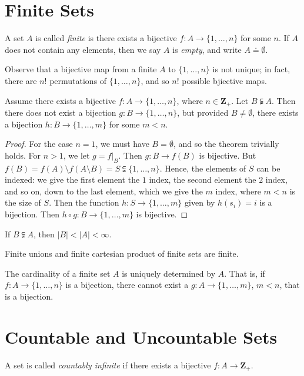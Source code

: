 \section{Finite Sets}
\begin{definition}
A set $A$ is called \emph{finite} is there exists a bijective
$f: A \to \{ 1, \dots, n\}$ for some $n$. If $A$ does not contain any
elements, then we say $A$ is \emph{empty}, and write $A \doteq \emptyset$.
\end{definition}
Observe that a bijective map from a finite $A$ to $\{1, \dots, n\}$ is not
unique; in fact, there are $n$! permutations of $\{1, \dots, n\}$, and so $n$! possible
bjiective maps.
\begin{theorem}\label{thm:subset-bij}
Assume there exists a bijective $f: A \to \{1, \dots, n\}$, where $n \in
\mathbf{Z}_{+}$. Let $B \subsetneqq A$. Then there does not exist a bijection $g: B
\to \{1, \dots, n\}$, but provided $B \neq \emptyset$, there exists a
bijection $h: B \to \{1, \dots, m\}$ for some $m < n$.
\end{theorem}
\begin{proof}
For the case $n=1$, we must have $B = \emptyset$, and so the theorem
trivially holds. For $n>1$, we let $g = f |_{B}$. Then $g: B \to f(B)$ is bijective. But
$f(B) = f(A) \setminus f(A \setminus B) = S \subsetneqq \{1, \dots, n\}$.
Hence, the elements of $S$ can be indexed: we give the first element the
$1$ index, the second element the $2$ index, and so on, down to the last
element, which we give the $m$ index, where $m < n$ is the size of $S$.
Then the function $h: S \to \{1, \dots, m\}$ given by $h(s_{i}) = i$
is a bijection. Then $h \circ g: B \to \{1, \dots, m\}$ is bijective.
\end{proof}
\begin{corollary}
If $B \subsetneqq A$, then $|B| < |A| < \infty$.
\end{corollary}
\begin{corollary}
Finite unions and finite cartesian product of finite sets are finite.
\end{corollary}
\begin{corollary}
The cardinality of a finite set $A$ is uniquely determined by $A$. That is,
if $f: A \to \{1, \dots, n\}$ is a bijection, there cannot exist a
$g: A \to \{ 1, \dots, m\}$, $m < n$, that is a bijection.
\end{corollary}
\section{Countable and Uncountable Sets}
\begin{definition}
A set is called \emph{countably infinite} if there exists a bijective
$f: A \to \mathbf{Z}_{+}$.
\end{definition}

